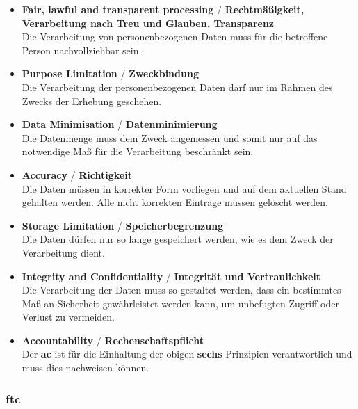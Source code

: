\begin{itemize}
\item \textbf{Fair, lawful and transparent processing} / \textbf{Rechtmäßigkeit, Verarbeitung nach Treu und Glauben, Transparenz} \\ Die Verarbeitung von personenbezogenen Daten muss für die betroffene Person nachvollziehbar sein.
\item \textbf{Purpose Limitation} / \textbf{Zweckbindung} \\ Die Verarbeitung der personenbezogenen Daten darf nur im Rahmen des Zwecks der Erhebung geschehen.
\item \textbf{Data Minimisation} / \textbf{Datenminimierung} \\ Die Datenmenge muss dem Zweck angemessen und somit nur auf das notwendige Maß für die Verarbeitung beschränkt sein.
\item \textbf{Accuracy} / \textbf{Richtigkeit} \\ Die Daten müssen in korrekter Form vorliegen und auf dem aktuellen Stand gehalten werden. Alle nicht korrekten Einträge müssen gelöscht werden.
\item \textbf{Storage Limitation} / \textbf{Speicherbegrenzung} \\ Die Daten dürfen nur so lange gespeichert werden, wie es dem Zweck der Verarbeitung dient.
\item \textbf{Integrity and Confidentiality} / \textbf{Integrität und Vertraulichkeit} \\ Die Verarbeitung der Daten muss so gestaltet werden, dass ein bestimmtes Maß an Sicherheit gewährleistet werden kann, um unbefugten Zugriff oder Verlust zu vermeiden.
\item \textbf{Accountability} / \textbf{Rechenschaftspflicht} \\ Der \textbf{\ac{ac}} ist für die Einhaltung der obigen \textbf{sechs} Prinzipien verantwortlich und muss dies nachweisen können.
\end{itemize}

\subsubsection{\acl{ftc}}
\label{sec:Grundlagen:ssec:Rechtliche Rahmenbedingungen:sssec:FTC}

